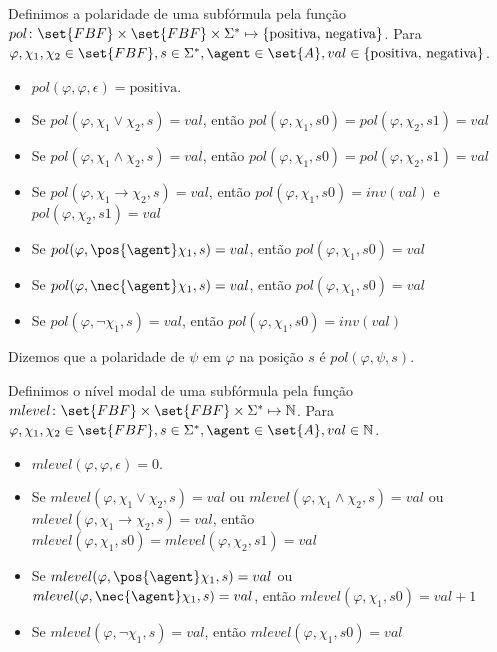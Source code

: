 \begin{definition}
	Definimos a polaridade de uma subfórmula pela função $pol \colon \set{FBF} \times \set{FBF} \times \Sigma^* \mapsto \{\text{positiva, negativa}\}$.  Para $\varphi, \chi_1, \chi_2 \in \set{FBF}, s \in \Sigma^*, \agent \in \set{A}, val \in \{\text{positiva, negativa}\}$.
	
	\begin{itemize}
		\item $pol(\varphi, \varphi, \epsilon) = \text{positiva}$.
		\item Se $pol(\varphi, \chi_1 \lor \chi_2, s) = val$, então $pol(\varphi, \chi_1, s0) = pol(\varphi, \chi_2, s1) = val$
		\item Se $pol(\varphi, \chi_1 \land \chi_2, s) = val$, então $pol(\varphi, \chi_1, s0) = pol(\varphi, \chi_2, s1) = val$
		\item Se $pol(\varphi, \chi_1 \rightarrow \chi_2, s) = val$, então $pol(\varphi, \chi_1, s0) = inv(val)$ e $pol(\varphi, \chi_2, s1) = val$
		\item Se $pol(\varphi, \pos{\agent}\chi_1, s) = val$, então $pol(\varphi, \chi_1, s0) = val$
		\item Se $pol(\varphi, \nec{\agent}\chi_1, s) = val$, então $pol(\varphi, \chi_1, s0) = val$
		\item Se $pol(\varphi, \neg\chi_1, s) = val$, então $pol(\varphi, \chi_1, s0) = inv(val)$
	\end{itemize}
	
\end{definition}
Dizemos que a polaridade de $\psi$ em $\varphi$ na posição $s$ é $pol(\varphi, \psi, s)$.

\begin{definition}
	Definimos o nível modal de uma subfórmula pela função $mlevel \colon \set{FBF} \times \set{FBF} \times \Sigma^* \mapsto \mathbb{N}$. Para $\varphi, \chi_1, \chi_2 \in \set{FBF}, s \in \Sigma^*, \agent \in \set{A}, val \in \mathbb{N}$.
	
	\begin{itemize}
		\item $mlevel(\varphi, \varphi, \epsilon) = 0$.
		\item Se $mlevel(\varphi, \chi_1 \lor \chi_2, s) = val$ ou $mlevel(\varphi, \chi_1 \land \chi_2, s) = val$ ou $mlevel(\varphi, \chi_1 \rightarrow \chi_2, s) = val$, então $mlevel(\varphi, \chi_1, s0) = mlevel(\varphi, \chi_2, s1) = val$
		\item Se $mlevel(\varphi, \pos{\agent}\chi_1, s) = val$ ou $mlevel(\varphi, \nec{\agent}\chi_1, s) = val$, então $mlevel(\varphi, \chi_1, s0) = val+1$
		\item Se $mlevel(\varphi, \neg\chi_1, s) = val$, então $mlevel(\varphi, \chi_1, s0) = val$
	\end{itemize}
\end{definition}


